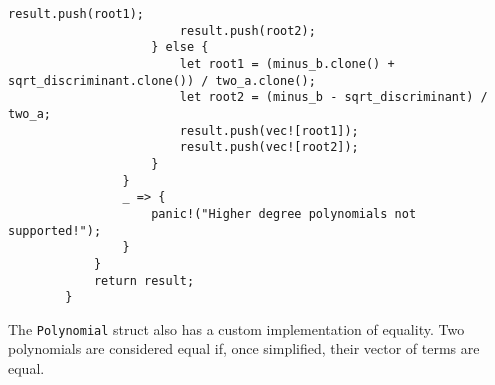 {\begin{lstlisting}[caption={The implementation of the \texttt{roots()} method for the \texttt{Polynomial} struct}, label={lst:polynomial-roots}]
                        result.push(root1);
                        result.push(root2);
                    } else {
                        let root1 = (minus_b.clone() + sqrt_discriminant.clone()) / two_a.clone();
                        let root2 = (minus_b - sqrt_discriminant) / two_a;
                        result.push(vec![root1]);
                        result.push(vec![root2]);
                    }
                }
                _ => {
                    panic!("Higher degree polynomials not supported!");
                }
            }
            return result;
        }
    \end{lstlisting}
}

The \verb|Polynomial| struct also has a custom implementation of equality. Two polynomials are considered equal if, once simplified, their vector of terms are equal.


